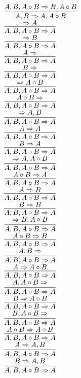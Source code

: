 \documentclass[11pt]{article}
\begin{document}
\begin{center}
\bigskip
\\$\infer{A, B\Rightarrow A, A\circ B}{A, B, A\circ B\Rightarrow B, A\circ B}$
\bigskip
\\$\infer{A, B, A\circ B\Rightarrow A}{\Rightarrow A}$
\bigskip
\\$\infer{A, B, A\circ B\Rightarrow A}{\Rightarrow B}$
\bigskip
\\$\infer{A, B, A\circ B\Rightarrow A}{A\Rightarrow }$
\bigskip
\\$\infer{A, B, A\circ B\Rightarrow A}{B\Rightarrow }$
\bigskip
\\$\infer{A, B, A\circ B\Rightarrow A}{\Rightarrow A\circ B}$
\bigskip
\\$\infer{A, B, A\circ B\Rightarrow A}{A\circ B\Rightarrow }$
\bigskip
\\$\infer{A, B, A\circ B\Rightarrow A}{\Rightarrow A, B}$
\bigskip
\\$\infer{A, B, A\circ B\Rightarrow A}{A\Rightarrow A}$
\bigskip
\\$\infer{A, B, A\circ B\Rightarrow A}{B\Rightarrow A}$
\bigskip
\\$\infer{A, B, A\circ B\Rightarrow A}{\Rightarrow A, A\circ B}$
\bigskip
\\$\infer{A, B, A\circ B\Rightarrow A}{A\circ B\Rightarrow A}$
\bigskip
\\$\infer{A, B, A\circ B\Rightarrow A}{A\Rightarrow B}$
\bigskip
\\$\infer{A, B, A\circ B\Rightarrow A}{B\Rightarrow B}$
\bigskip
\\$\infer{A, B, A\circ B\Rightarrow A}{\Rightarrow B, A\circ B}$
\bigskip
\\$\infer{A, B, A\circ B\Rightarrow A}{A\circ B\Rightarrow B}$
\bigskip
\\$\infer{A, B, A\circ B\Rightarrow A}{A, B\Rightarrow }$
\bigskip
\\$\infer{A, B, A\circ B\Rightarrow A}{A\Rightarrow A\circ B}$
\bigskip
\\$\infer{A, B, A\circ B\Rightarrow A}{A, A\circ B\Rightarrow }$
\bigskip
\\$\infer{A, B, A\circ B\Rightarrow A}{B\Rightarrow A\circ B}$
\bigskip
\\$\infer{A, B, A\circ B\Rightarrow A}{B, A\circ B\Rightarrow }$
\bigskip
\\$\infer{A, B, A\circ B\Rightarrow A}{A\circ B\Rightarrow A\circ B}$
\bigskip
\\$\infer{A, B, A\circ B\Rightarrow A}{A\Rightarrow A, B}$
\bigskip
\\$\infer{A, B, A\circ B\Rightarrow A}{B\Rightarrow A, B}$

\end{center}
\end{document}
